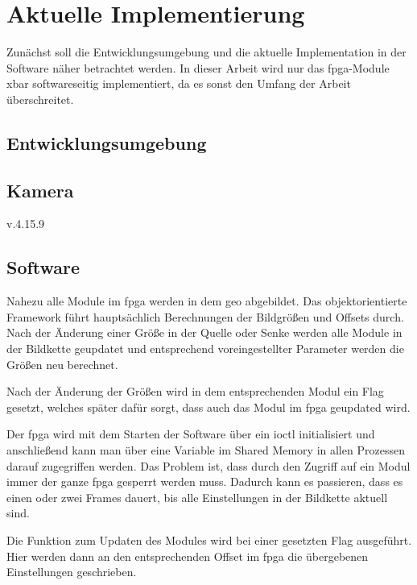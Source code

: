 \chapter{Aktuelle Implementierung} \label{sec:imp}
Zunächst soll die Entwicklungsumgebung und die aktuelle Implementation in der Software näher betrachtet werden. In dieser Arbeit wird nur das \ac{fpga}-Module \ac{xbar} softwareseitig implementiert, da es sonst den Umfang der Arbeit überschreitet. 

\section{Entwicklungsumgebung}

\section{Kamera}
v.4.15.9

\section{Software}
Nahezu alle Module im \ac{fpga} werden in dem \ac{geo} abgebildet. Das objektorientierte Framework führt hauptsächlich Berechnungen der Bildgrößen und Offsets durch. Nach der Änderung einer Größe in der Quelle oder Senke werden alle Module in der Bildkette geupdatet und entsprechend voreingestellter Parameter werden die Größen neu berechnet. 

Nach der Änderung der Größen wird in dem entsprechenden Modul ein Flag gesetzt, welches später dafür sorgt, dass auch das Modul im \ac{fpga} geupdated wird.

Der \ac{fpga} wird mit dem Starten der Software über ein \ac{ioctl} initialisiert und anschließend kann man über eine Variable im Shared Memory in allen Prozessen darauf zugegriffen werden. Das Problem ist, dass durch den Zugriff auf ein Modul immer der ganze \ac{fpga} gesperrt werden muss. Dadurch kann es passieren, dass es einen oder zwei Frames dauert, bis alle Einstellungen in der Bildkette aktuell sind.

Die Funktion zum Updaten des Modules wird bei einer gesetzten Flag ausgeführt. Hier werden dann an den entsprechenden Offset im \ac{fpga} die übergebenen Einstellungen geschrieben. 
